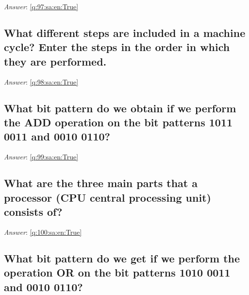 \documentclass[a4paper,11pt,oneside]{article}
\begin{document}
\begin{sloppypar}
\vspace{1cm}

\textit{Answer}: \autoref{q:97:sa:en:True}



\subsection{What different steps are included in a machine cycle? Enter the steps in the order in which they are performed.}

\label{q:98:sa:en:False}

\vspace{2cm}

\noindent\makebox[\textwidth]{\hrulefill}

\vspace{1cm}

\textit{Answer}: \autoref{q:98:sa:en:True}



\subsection{What bit pattern do we obtain if we perform the ADD operation on the bit patterns 1011 0011 and 0010 0110?}

\label{q:99:sa:en:False}

\vspace{2cm}

\noindent\makebox[\textwidth]{\hrulefill}

\vspace{1cm}

\textit{Answer}: \autoref{q:99:sa:en:True}



\subsection{What are the three main parts that a processor (CPU {\textendash} central processing unit) consists of?}

\label{q:100:sa:en:False}

\vspace{2cm}

\noindent\makebox[\textwidth]{\hrulefill}

\vspace{1cm}

\textit{Answer}: \autoref{q:100:sa:en:True}



\subsection{What bit pattern do we get if we perform the operation OR on the bit patterns 1010 0011 and 0010 0110?}


\end{sloppypar}
\end{document}
